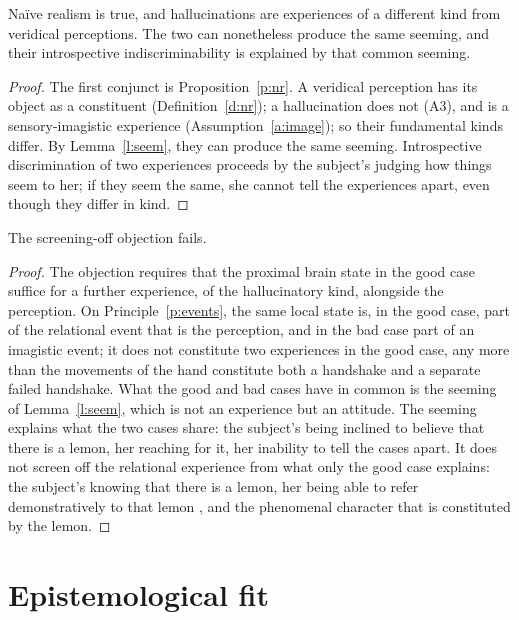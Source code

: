 \documentclass{situationist-preprint}
\begin{document}
\begin{theorem}\label{t:main}
Naïve realism is true, and hallucinations are experiences of a different kind from veridical perceptions. The two can nonetheless produce the same seeming, and their introspective indiscriminability is explained by that common seeming.
\end{theorem}

\begin{proof}
The first conjunct is Proposition~\ref{p:nr}. A veridical perception has its object as a constituent (Definition~\ref{d:nr}); a hallucination does not (A3), and is a sensory-imagistic experience (Assumption~\ref{a:image}); so their fundamental kinds differ. By Lemma~\ref{l:seem}, they can produce the same seeming. Introspective discrimination of two experiences proceeds by the subject's judging how things seem to her; if they seem the same, she cannot tell the experiences apart, even though they differ in kind.
\end{proof}

\begin{corollary}\label{c:screen}
The screening-off objection fails.
\end{corollary}

\begin{proof}
The objection requires that the proximal brain state in the good case suffice for a further experience, of the hallucinatory kind, alongside the perception. On Principle~\ref{p:events}, the same local state is, in the good case, part of the relational event that is the perception, and in the bad case part of an imagistic event; it does not constitute two experiences in the good case, any more than the movements of the hand constitute both a handshake and a separate failed handshake. What the good and bad cases have in common is the seeming of Lemma~\ref{l:seem}, which is not an experience but an attitude. The seeming explains what the two cases share: the subject's being inclined to believe that there is a lemon, her reaching for it, her inability to tell the cases apart. It does not screen off the relational experience from what only the good case explains: the subject's knowing that there is a lemon, her being able to refer demonstratively to that lemon \citep{Campbell2002}, and the phenomenal character that is constituted by the lemon.
\end{proof}

\section{Epistemological fit}
\end{document}
